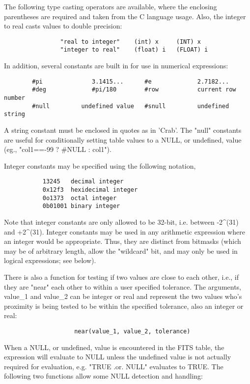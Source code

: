 \documentclass[11pt]{book}
\begin{document}
The following type casting operators are available, where the
enclosing parentheses are required and taken from the C language
usage. Also, the integer to real casts values to double precision:

\begin{verbatim}
                "real to integer"    (int) x     (INT) x
                "integer to real"    (float) i   (FLOAT) i
\end{verbatim}

    In addition, several constants are built in  for  use  in  numerical
    expressions:


\begin{verbatim}
        #pi              3.1415...      #e             2.7182...
        #deg             #pi/180        #row           current row number
        #null         undefined value   #snull         undefined string
\end{verbatim}

    A  string constant must  be enclosed  in quotes  as in  'Crab'.  The
    "null" constants  are useful for conditionally  setting table values
    to a NULL, or undefined, value (eg., "col1==-99 ? \#NULL : col1").

    Integer constants may be specified using the following notation,
\begin{verbatim}
           13245   decimal integer
           0x12f3  hexidecimal integer
           0o1373  octal integer
           0b01001 binary integer
\end{verbatim}
    Note that integer constants are only allowed to be 32-bit, i.e.
    between -2^(31) and +2^(31).  Integer constants may be used in any
    arithmetic expression where an integer would be appropriate.  Thus,
    they are distinct from bitmasks (which may be of arbitrary length,
    allow the "wildcard" bit, and may only be used in logical
    expressions; see below).

    There is also a function for testing if  two  values  are  close  to
    each  other,  i.e.,  if  they are "near" each other to within a user
    specified tolerance. The  arguments,  value\_1  and  value\_2  can  be
    integer  or  real  and  represent  the two values who's proximity is
    being tested to be within the specified tolerance, also  an  integer
    or real:

\begin{verbatim}
                    near(value_1, value_2, tolerance)
\end{verbatim}
    When  a  NULL, or undefined, value is encountered in the FITS table,
    the expression will evaluate to NULL unless the undefined  value  is
    not   actually   required  for  evaluation,  e.g. "TRUE  .or.  NULL"
    evaluates to TRUE. The  following  two  functions  allow  some  NULL
    detection  and  handling:
\end{document}
